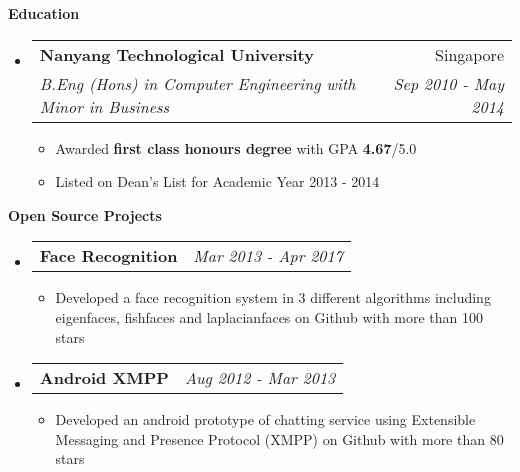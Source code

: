 \documentclass[a4paper,12pt]{article}
\makeatletter
\newcommand{\resitem}[1]{\item #1 \vspace{-2pt}}
\newcommand{\resheading}[1]{{\large {\begin{minipage}{\textwidth}{\textbf{#1 \vphantom{p\^{E}}}}\end{minipage}}}}
\newcommand{\ressubheading}[4]{
\begin{tabular*}{6.3in}{l@{\extracolsep{\fill}}r}
		
		\textbf{#1} & #2 \\
		\textit{#3} & \textit{#4} \\

\end{tabular*}\vspace{-6pt}}
\newcommand{\projectsubheading}[2]{
\begin{tabular*}{6.3in}{l@{\extracolsep{\fill}}r}
		\textbf{#1} & \textit{#2} \\
\end{tabular*}\vspace{-6pt}}
\makeatother
\begin{document}
\resheading{Education}
\begin{itemize}
\item
	\ressubheading{Nanyang Technological University}{Singapore}{B.Eng (Hons) in Computer Engineering with Minor in Business}{Sep 2010 - May 2014}
	\begin{itemize}
		\resitem {Awarded \textbf{first class honours degree} with GPA \textbf{4.67}/5.0}
		\resitem {Listed on Dean's List for Academic Year 2013 - 2014}
	\end{itemize}
\end{itemize}

\resheading {Open Source Projects}
\begin{itemize}
\item
	\projectsubheading {Face Recognition}{Mar 2013 - Apr 2017}
	\begin{itemize}
		\resitem {Developed a face recognition system in 3 different algorithms including eigenfaces, fishfaces and laplacianfaces on Github with more than 100 stars}
	\end{itemize}
\end{itemize}

\begin{itemize}
\item
	\projectsubheading {Android XMPP}{Aug 2012 - Mar 2013}
	\begin{itemize}
		\resitem {Developed an android prototype of chatting service using Extensible Messaging and Presence Protocol (XMPP) on Github with more than 80 stars}
	\end{itemize}
\end{itemize}



\end{document}
